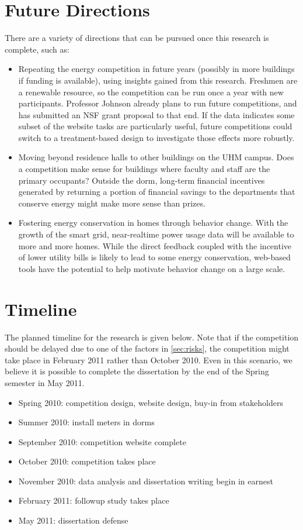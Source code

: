 \section{Future Directions}

There are a variety of directions that can be pursued once this research is complete, such as:

\begin{itemize}
	\item Repeating the energy competition in future years (possibly in more buildings if funding is available), using insights gained from this research. Freshmen are a renewable resource, so the competition can be run once a year with new participants. Professor Johnson already plans to run future competitions, and has submitted an NSF grant proposal to that end. If the data indicates some subset of the website tasks are particularly useful, future competitions could switch to a treatment-based design to investigate those effects more robustly.
	\item Moving beyond residence halls to other buildings on the UHM campus. Does a competition make sense for buildings where faculty and staff are the primary occupants? Outside the dorm, long-term financial incentives generated by returning a portion of financial savings to the departments that conserve energy might make more sense than prizes.
	\item Fostering energy conservation in homes through behavior change. With the growth of the smart grid, near-realtime power usage data will be available to more and more homes. While the direct feedback coupled with the incentive of lower utility bills is likely to lead to some energy conservation, web-based tools have the potential to help motivate behavior change on a large scale.
\end{itemize}

\section{Timeline}

The planned timeline for the research is given below. Note that if the competition should be delayed due to one of the factors in \autoref{sec:risks}, the competition might take place in February 2011 rather than October 2010. Even in this scenario, we believe it is possible to complete the dissertation by the end of the Spring semester in May 2011.

\begin{itemize}
	\item Spring 2010: competition design, website design, buy-in from stakeholders
	\item Summer 2010: install meters in dorms
	\item September 2010: competition website complete
	\item October 2010: competition takes place
	\item November 2010: data analysis and dissertation writing begin in earnest
	\item February 2011: followup study takes place
	\item May 2011: dissertation defense
\end{itemize}

